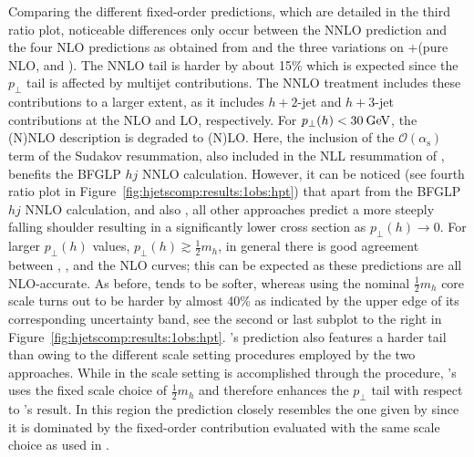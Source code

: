 Comparing the different fixed-order predictions, which are detailed in 
the third ratio plot, noticeable differences only
occur between the NNLO prediction and the four NLO predictions as
obtained from \Powheg and the three variations on \GoSam{}+\Sherpa (pure
NLO, \Minlo and \Loopsim). The NNLO tail is harder by about 15\% which
is expected since the $p_\perp$ tail is affected by multijet
contributions. The NNLO treatment includes these contributions to a
larger extent, as it includes $h+2$-jet and $h+3$-jet contributions at
the NLO and LO, respectively. For $p_\perp(h)<30\text{\:GeV}$, the (N)NLO
description is degraded to (N)LO. Here, the inclusion of the
$\mathcal{O}(\alpha_\mathrm{s})$ term of the Sudakov resummation, also
included in the NLL resummation of \Resbos, benefits the BFGLP $hj$
NNLO calculation. However, it can be noticed (see fourth ratio plot in
Figure~\ref{fig:hjetscomp:results:1obs:hpt}) that apart from the BFGLP
$hj$ NNLO calculation, \Resbos and also \Powheg, all other approaches
predict a more steeply falling shoulder resulting in a significantly
lower cross section as $p_\perp(h)\to0$.
For larger $p_\perp(h)$ values, $p_\perp(h)\gtrsim\tfrac{1}{2}m_h$, in
general there is good agreement between \Powheg, \MGaMC, \Sherpa
\MEPSatNLO and the NLO curves; this can be expected as these
predictions are all NLO-accurate. As before, \Herwig tends to be
softer, whereas \MGaMC using the nominal $\tfrac{1}{2}m_h$ core scale
turns out to be harder by almost 40\% as indicated by the upper edge
of its corresponding uncertainty band, see the second or last subplot
to the right in Figure~\ref{fig:hjetscomp:results:1obs:hpt}. \Sherpa's
\NNLOPS prediction also features a harder tail than \Powheg owing to the
different scale setting procedures employed by the two approaches.
While in \Powheg the scale setting is accomplished through the \Minlo
procedure, \Sherpa's \NNLOPS uses the fixed scale choice of $\tfrac{1}{2}m_h$
and therefore enhances the $p_\perp$ tail with respect to \Powheg's
result. In this region the \Resbos prediction closely resembles the
one given by \Sherpa \NNLOPS since it is dominated by the fixed-order
contribution evaluated with the same scale choice as used in \Sherpa.

